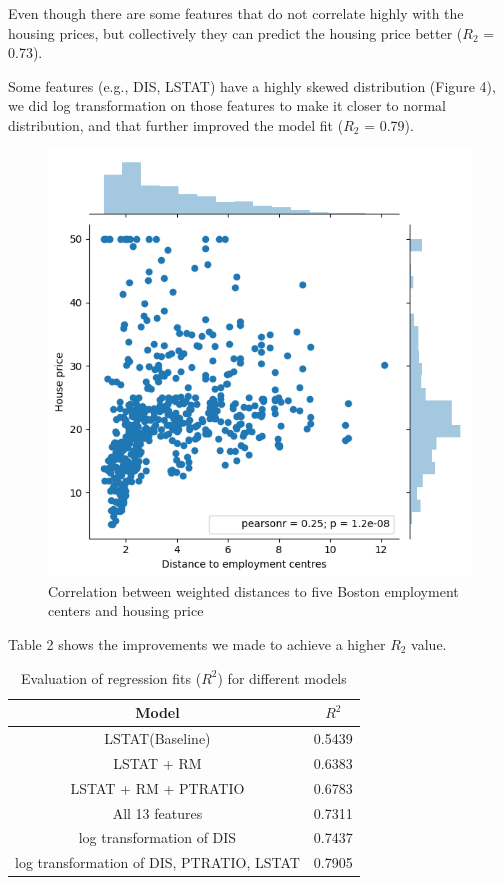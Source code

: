 \documentclass[11pt]{article}
\begin{document}
Even though there are some features that do not correlate highly with the housing prices, but collectively they can predict the housing price better ($R_{2}$ = 0.73). 

Some features (e.g., DIS, LSTAT) have a highly skewed distribution (Figure 4), we did log transformation on those features to make it closer to normal distribution, and that further improved the model fit ($R_{2}$ = 0.79).\\

\begin{figure}[!htbp]
 \centering
 \includegraphics[scale = 0.5]{distance}
 \captionsetup{font=scriptsize}
  \caption[8pt]{Correlation between weighted distances to five Boston employment centers and housing price}
\end{figure}

Table 2 shows the improvements we made to achieve a higher $R_{2}$ value.

\begin{table}[!htbp]
\small
\centering
\captionsetup{font=scriptsize}
\caption[8pt]{Evaluation of regression fits ($R^{2}$) for different models}
\begin{tabular}{|c|c|}
 \hline
Model & $R^{2}$ \\
  \hline
LSTAT(Baseline)  & 0.5439\\
LSTAT + RM      & 0.6383 \\
LSTAT + RM + PTRATIO    & 0.6783 \\
All 13 features & 0.7311 \\
log transformation of DIS     & 0.7437 \\
log transformation of DIS, PTRATIO, LSTAT   & 0.7905\\
\hline
\end{tabular}
\end{table}
\end{document}
